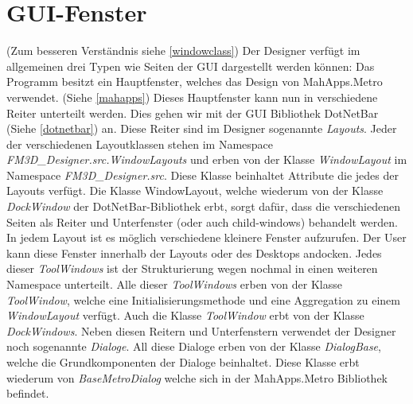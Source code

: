 \section{GUI-Fenster}
\label{guifenster0}

(Zum besseren Verständnis siehe \cref{windowclass})
Der Designer verfügt im allgemeinen drei Typen wie Seiten der GUI dargestellt werden können: Das Programm besitzt ein Hauptfenster, welches das Design von MahApps.Metro verwendet. (Siehe \cref{mahapps})
Dieses Hauptfenster kann nun in verschiedene Reiter unterteilt werden. Dies gehen wir mit der GUI Bibliothek DotNetBar (Siehe \cref{dotnetbar}) an.
Diese Reiter sind im Designer sogenannte \textit{Layouts}. Jeder der verschiedenen Layoutklassen stehen im Namespace \textit{FM3D\_Designer.src.WindowLayouts} und erben von der Klasse \textit{WindowLayout} im Namespace \textit{FM3D\_Designer.src}. Diese Klasse beinhaltet Attribute die jedes der Layouts verfügt. Die Klasse WindowLayout, welche wiederum von der Klasse \textit{DockWindow} der DotNetBar-Bibliothek erbt, sorgt dafür, dass die verschiedenen Seiten als Reiter und Unterfenster (oder auch child-windows) behandelt werden.
In jedem Layout ist es möglich verschiedene  kleinere Fenster aufzurufen. Der User kann diese Fenster innerhalb der Layouts oder des Desktops andocken. Jedes dieser \textit{ToolWindows} ist der Strukturierung wegen nochmal in einen weiteren Namespace unterteilt. Alle dieser \textit{ToolWindows} erben von der Klasse \textit{ToolWindow}, welche eine Initialisierungsmethode und eine Aggregation zu einem \textit{WindowLayout} verfügt.
Auch die Klasse \textit{ToolWindow} erbt von der Klasse \textit{DockWindows}.
Neben diesen Reitern und Unterfenstern verwendet der Designer noch sogenannte \textit{Dialoge}. All diese Dialoge erben von der Klasse \textit{DialogBase}, welche die Grundkomponenten der Dialoge beinhaltet. Diese Klasse erbt wiederum von \textit{BaseMetroDialog} welche sich in der MahApps.Metro Bibliothek befindet. 

